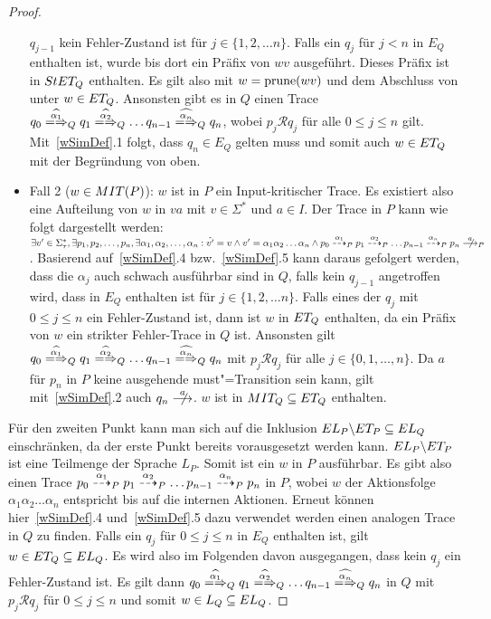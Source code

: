 \begin{proof}
\begin{itemize}
      $q_{j-1}$ kein Fehler-Zustand ist für $j\in \{1,2,\dots n\}$. Falls ein
      $q_j$ für $j < n$ in $E_Q$ enthalten ist, wurde bis dort ein Präfix von
      $wv$ ausgeführt. Dieses Präfix ist in $StET _Q$ enthalten. Es gilt also
      mit $w=\mathrm{prune} (wv)$ und dem Abschluss von \ET{} unter \cont{} $w\in ET
      _Q$. Ansonsten gibt es in $Q$ einen Trace $q_0 \weakmay[\widehat{\alpha
      _1}]_Q q_1 \weakmay[\widehat{\alpha _2}]_Q \dots q_{n-1}
      \weakmay[\widehat{\alpha _n}]_Q q_n$, wobei $p_j \mathcal{R} q_j$ für
      alle $0 \leq j \leq n$ gilt. Mit~\ref{wSimDef}.1 folgt, dass $q_n\in E_Q$
      gelten muss und somit auch $w\in ET _Q$ mit der Begründung von oben.
    \item Fall 2 ($w\in MIT (P)$): $w$ ist in $P$ ein Input-kritischer Trace.
      Es existiert also eine Aufteilung von $w$ in $va$ mit $v\in \Sigma ^*$
      und $a\in I$. Der Trace in $P$ kann wie folgt dargestellt werden:
      $\exists v'\in \Sigma _{\tau}^*, \exists p_1, p_2, \dots , p_n, \exists
      \alpha _1, \alpha _2, \dots , \alpha _n: \hat{v'}=v \land v'=\alpha _1
      \alpha _2 \dots \alpha _n \land p_0 \may[\alpha _1]_P p_1 \may[\alpha
      _2]_P \dots p_{n-1} \may[\alpha _n]_P p_n \nmust[a]_P$. Basierend
      auf~\ref{wSimDef}.4 bzw.~\ref{wSimDef}.5 kann daraus gefolgert werden,
      dass die $\alpha _j$ auch schwach ausführbar sind in $Q$, falls kein
      $q_{j-1}$ angetroffen wird, dass in $E_Q$ enthalten ist für $j\in
      \{1,2,\dots n\}$. Falls eines der $q_j$ mit $0 \leq j \leq n$ ein
      Fehler-Zustand ist, dann ist $w$ in $ET _Q$ enthalten, da ein Präfix von
      $w$ ein strikter Fehler-Trace in $Q$ ist. Ansonsten gilt $q_0
      \weakmay[\widehat{\alpha _1}]_Q q_1 \weakmay[\widehat{\alpha _2}]_Q \dots
      q_{n-1} \weakmay[\widehat{\alpha _n}]_Q q_n$ mit $p_j \mathcal{R} q_j$
      für alle $j\in \{0,1, \dots , n\}$. Da $a$ für $p_n$ in $P$ keine
      ausgehende must"=Transition sein kann, gilt mit~\ref{wSimDef}.2 auch $q_n
      \nmust[a]$. $w$ ist in $MIT _Q \subseteq ET _Q$ enthalten.
  \end{itemize}
  Für den zweiten Punkt kann man sich auf die Inklusion $EL _P\backslash ET _P
  \subseteq EL _Q$ einschränken, da der erste Punkt bereits vorausgesetzt
  werden kann. $EL _P\backslash ET _P$ ist eine Teilmenge der Sprache $L _P$.
  Somit ist ein $w$ in $P$ ausführbar. Es gibt also einen Trace $p_0
  \may[\alpha _1]_P p_1 \may[\alpha _2]_P \dots p_{n-1} \may[\alpha _n]_P p_n$
  in $P$, wobei $w$ der Aktionsfolge $\alpha _1\alpha _2 \dots \alpha _n$
  entspricht bis auf die internen Aktionen. Erneut können hier~\ref{wSimDef}.4
  und~\ref{wSimDef}.5 dazu verwendet werden einen analogen Trace in $Q$ zu
  finden. Falls ein $q_j$ für $0 \leq j \leq n$ in $E_Q$ enthalten ist, gilt
  $w\in ET _Q \subseteq EL _Q$. Es wird also im Folgenden davon ausgegangen,
  dass kein $q_j$ ein Fehler-Zustand ist. Es gilt dann $q_0
  \weakmay[\widehat{\alpha _1}]_Q q_1 \weakmay[\widehat{\alpha _2}]_Q \dots
  q_{n-1} \weakmay[\widehat{\alpha _n}]_Q q_n$ in $Q$ mit $p_j \mathcal{R} q_j$
  für $0 \leq j \leq n$ und somit $w\in L _Q\subseteq EL _Q$.


\end{proof}
